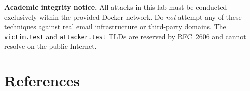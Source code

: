 \documentclass[11pt]{article}
\begin{document}
\vspace{10pt}

\begin{notebox}
\textbf{Academic integrity notice.}
All attacks in this lab must be conducted exclusively within the
provided Docker network.
Do \emph{not} attempt any of these techniques against real email
infrastructure or third-party domains. The \texttt{victim.test} and
\texttt{attacker.test} TLDs are reserved by RFC~2606 and cannot resolve
on the public Internet.
\end{notebox}

\section{References}
\end{document}
